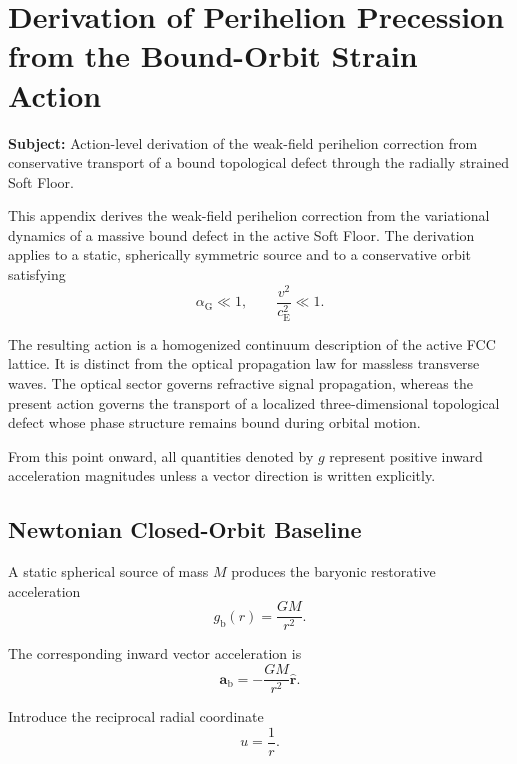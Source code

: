 \chapter{Derivation of Perihelion Precession from the Bound-Orbit Strain Action}
\label{app:perihelion_orbital_strain}

\noindent\textbf{Subject:} Action-level derivation of the weak-field perihelion correction from conservative transport of a bound topological defect through the radially strained Soft Floor.

This appendix derives the weak-field perihelion correction from the variational dynamics of a massive bound defect in the active Soft Floor. The derivation applies to a static, spherically symmetric source and to a conservative orbit satisfying
\begin{equation}
    \alpha_{\mathrm{G}} \ll 1, \qquad \frac{v^2}{c_{\mathrm{E}}^2} \ll 1.
\end{equation}

The resulting action is a homogenized continuum description of the active FCC lattice. It is distinct from the optical propagation law for massless transverse waves. The optical sector governs refractive signal propagation, whereas the present action governs the transport of a localized three-dimensional topological defect whose phase structure remains bound during orbital motion.

From this point onward, all quantities denoted by $g$ represent positive inward acceleration magnitudes unless a vector direction is written explicitly.

\section{Newtonian Closed-Orbit Baseline}

A static spherical source of mass $M$ produces the baryonic restorative acceleration
\begin{equation}
    g_{\mathrm{b}}(r) = \frac{GM}{r^2}.
\end{equation}

The corresponding inward vector acceleration is
\begin{equation}
    \mathbf{a}_{\mathrm{b}} = -\frac{GM}{r^2}\hat{\mathbf{r}}.
\end{equation}

Introduce the reciprocal radial coordinate
\begin{equation}
    u = \frac{1}{r}.
\end{equation}

